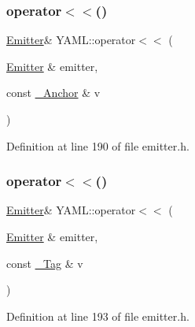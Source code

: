 \subsubsection{\texorpdfstring{operator$<$$<$()}{operator<<()}\hspace{0.1cm}{\footnotesize\ttfamily [17/35]}}
{\footnotesize\ttfamily \mbox{\hyperlink{class_y_a_m_l_1_1_emitter}{Emitter}}\& Y\+A\+M\+L\+::operator$<$$<$ (\begin{DoxyParamCaption}\item[{\mbox{\hyperlink{class_y_a_m_l_1_1_emitter}{Emitter}} \&}]{emitter,  }\item[{const \mbox{\hyperlink{struct_y_a_m_l_1_1___anchor}{\+\_\+\+Anchor}} \&}]{v }\end{DoxyParamCaption})\hspace{0.3cm}{\ttfamily [inline]}}



Definition at line 190 of file emitter.\+h.

\mbox{\label{namespace_y_a_m_l_a470884ef87ed9df21f01fafec074f2a4}} 
\subsubsection{\texorpdfstring{operator$<$$<$()}{operator<<()}\hspace{0.1cm}{\footnotesize\ttfamily [18/35]}}
{\footnotesize\ttfamily \mbox{\hyperlink{class_y_a_m_l_1_1_emitter}{Emitter}}\& Y\+A\+M\+L\+::operator$<$$<$ (\begin{DoxyParamCaption}\item[{\mbox{\hyperlink{class_y_a_m_l_1_1_emitter}{Emitter}} \&}]{emitter,  }\item[{const \mbox{\hyperlink{struct_y_a_m_l_1_1___tag}{\+\_\+\+Tag}} \&}]{v }\end{DoxyParamCaption})\hspace{0.3cm}{\ttfamily [inline]}}



Definition at line 193 of file emitter.\+h.

\mbox{\label{namespace_y_a_m_l_a9080ec52e398271bdef81bdddf99be1d}} 
